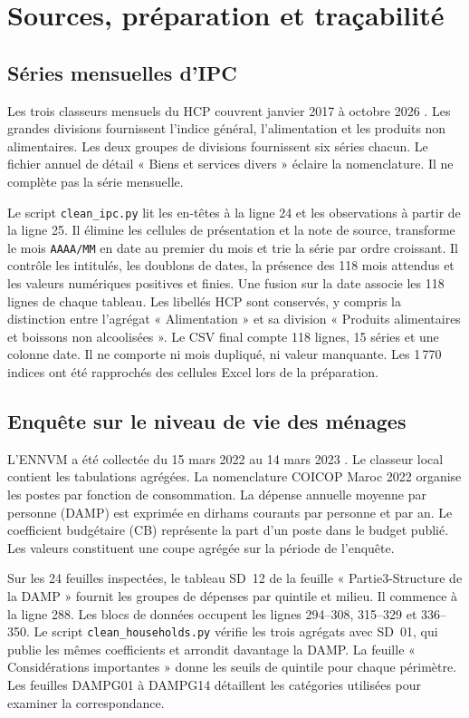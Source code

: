 \chapter{Sources, préparation et traçabilité}
\section{Séries mensuelles d'IPC}
Les trois classeurs mensuels du HCP couvrent janvier 2017 à octobre 2026 \cite{hcpIndicateurs}. Les grandes divisions fournissent l'indice général, l'alimentation et les produits non alimentaires. Les deux groupes de divisions fournissent six séries chacun. Le fichier annuel de détail « Biens et services divers » éclaire la nomenclature. Il ne complète pas la série mensuelle.

Le script \texttt{clean\_ipc.py} lit les en-têtes à la ligne 24 et les observations à partir de la ligne 25. Il élimine les cellules de présentation et la note de source, transforme le mois \texttt{AAAA/MM} en date au premier du mois et trie la série par ordre croissant. Il contrôle les intitulés, les doublons de dates, la présence des 118 mois attendus et les valeurs numériques positives et finies. Une fusion sur la date associe les 118 lignes de chaque tableau. Les libellés HCP sont conservés, y compris la distinction entre l'agrégat « Alimentation » et sa division « Produits alimentaires et boissons non alcoolisées ». Le CSV final compte 118 lignes, 15 séries et une colonne date. Il ne comporte ni mois dupliqué, ni valeur manquante. Les 1\,770 indices ont été rapprochés des cellules Excel lors de la préparation.

\section{Enquête sur le niveau de vie des ménages}
L'ENNVM a été collectée du 15 mars 2022 au 14 mars 2023 \cite{hcpENNVM}. Le classeur local contient les tabulations agrégées. La nomenclature COICOP Maroc 2022 organise les postes par fonction de consommation. La dépense annuelle moyenne par personne (DAMP) est exprimée en dirhams courants par personne et par an. Le coefficient budgétaire (CB) représente la part d'un poste dans le budget publié. Les valeurs constituent une coupe agrégée sur la période de l'enquête.

Sur les 24 feuilles inspectées, le tableau SD~12 de la feuille « Partie3-Structure de la DAMP » fournit les groupes de dépenses par quintile et milieu. Il commence à la ligne 288. Les blocs de données occupent les lignes 294--308, 315--329 et 336--350. Le script \texttt{clean\_households.py} vérifie les trois agrégats avec SD~01, qui publie les mêmes coefficients et arrondit davantage la DAMP. La feuille « Considérations importantes » donne les seuils de quintile pour chaque périmètre. Les feuilles DAMPG01 à DAMPG14 détaillent les catégories utilisées pour examiner la correspondance.

